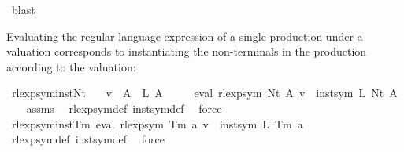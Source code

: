 \begin{isabellebody}
\ blast\isanewline
{}\isamarkupfalse%
%
\endisatagproof
{\isafoldproof}%
%
\isadelimproof
%
\endisadelimproof
%
\begin{isamarkuptext}%
Evaluating the regular language expression of a single production under a valuation
corresponds to instantiating the non-terminals in the production according to the valuation:%
\end{isamarkuptext}\isamarkuptrue%
\isamarkupfalse%
\ rlexp{\isacharunderscore}{\kern0pt}sym{\isacharunderscore}{\kern0pt}inst{\isacharunderscore}{\kern0pt}Nt{\isacharcolon}{\kern0pt}\isanewline
\ \ \ {\isachardoublequoteopen}v\ {\isacharparenleft}{\kern0pt}{\isasymgamma}{\isacharprime}{\kern0pt}\ A{\isacharparenright}{\kern0pt}\ {\isacharequal}{\kern0pt}\ L\ A{\isachardoublequoteclose}\isanewline
\ \ \ \ \ {\isachardoublequoteopen}eval\ {\isacharparenleft}{\kern0pt}rlexp{\isacharunderscore}{\kern0pt}sym\ {\isacharparenleft}{\kern0pt}Nt\ A{\isacharparenright}{\kern0pt}{\isacharparenright}{\kern0pt}\ v\ {\isacharequal}{\kern0pt}\ inst{\isacharunderscore}{\kern0pt}sym\ L\ {\isacharparenleft}{\kern0pt}Nt\ A{\isacharparenright}{\kern0pt}{\isachardoublequoteclose}\isanewline
%
\isadelimproof
\ \ %
\endisadelimproof
%
\isatagproof
{}\isamarkupfalse%
\ assms\ \isamarkupfalse%
\ rlexp{\isacharunderscore}{\kern0pt}sym{\isacharunderscore}{\kern0pt}def\ inst{\isacharunderscore}{\kern0pt}sym{\isacharunderscore}{\kern0pt}def\ \isamarkupfalse%
\ force%
\endisatagproof
{\isafoldproof}%
%
\isadelimproof
\isanewline
%
\endisadelimproof
\isanewline
{}\isamarkupfalse%
\ rlexp{\isacharunderscore}{\kern0pt}sym{\isacharunderscore}{\kern0pt}inst{\isacharunderscore}{\kern0pt}Tm{\isacharcolon}{\kern0pt}\ {\isachardoublequoteopen}eval\ {\isacharparenleft}{\kern0pt}rlexp{\isacharunderscore}{\kern0pt}sym\ {\isacharparenleft}{\kern0pt}Tm\ a{\isacharparenright}{\kern0pt}{\isacharparenright}{\kern0pt}\ v\ {\isacharequal}{\kern0pt}\ inst{\isacharunderscore}{\kern0pt}sym\ L\ {\isacharparenleft}{\kern0pt}Tm\ a{\isacharparenright}{\kern0pt}{\isachardoublequoteclose}\isanewline
%
\isadelimproof
\ \ %
\endisadelimproof
%
\isatagproof
{}\isamarkupfalse%
\ rlexp{\isacharunderscore}{\kern0pt}sym{\isacharunderscore}{\kern0pt}def\ inst{\isacharunderscore}{\kern0pt}sym{\isacharunderscore}{\kern0pt}def\ \isamarkupfalse%
\ force%
\endisatagproof
{\isafoldproof}%
%
\isadelimproof
\isanewline
%
\endisadelimproof
\isanewline

\end{isabellebody}
